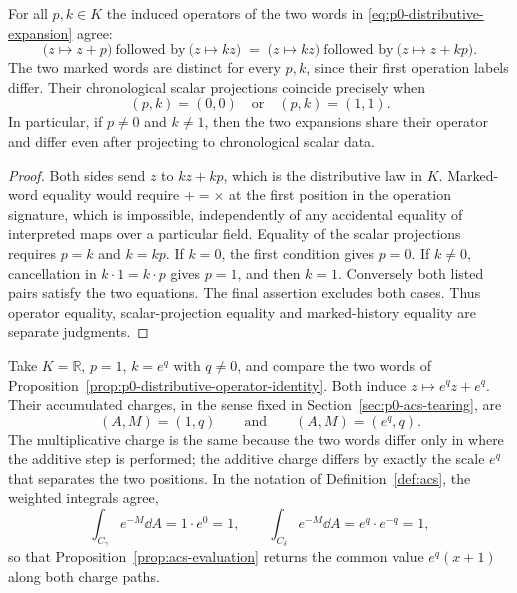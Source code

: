 \begin{proposition}
\label{prop:p0-distributive-operator-identity}
For all $p,k\in K$ the induced operators of the two words in
\eqref{eq:p0-distributive-expansion} agree:
\begin{equation}\label{eq:p0-distributive-identity}
  \bigl(z\mapsto z+p\bigr)\ \text{followed by}\ \bigl(z\mapsto kz\bigr)
  \;=\;
  \bigl(z\mapsto kz\bigr)\ \text{followed by}\ \bigl(z\mapsto z+kp\bigr).
\end{equation}
The two marked words are distinct for every $p,k$, since their first
operation labels differ.  Their chronological scalar projections coincide
precisely when
\[
  (p,k)=(0,0)\quad\text{or}\quad(p,k)=(1,1).
\]
In particular, if $p\ne0$ and $k\ne1$, then the two expansions share their
operator and differ even after projecting to chronological scalar data.
\end{proposition}

\begin{proof}
Both sides send $z$ to $kz+kp$, which is the distributive law in $K$.
Marked-word equality would require $+=\times$ at the first position in the
operation signature, which is impossible, independently of any accidental
equality of interpreted maps over a particular field.  Equality of the
scalar projections requires $p=k$ and $k=kp$.  If $k=0$, the first condition
gives $p=0$.  If $k\ne0$, cancellation in $k\cdot1=k\cdot p$ gives
$p=1$, and then $k=1$.  Conversely both listed pairs satisfy the two
equations.  The final assertion excludes both cases.  Thus operator
equality, scalar-projection equality and marked-history equality are
separate judgments.
\end{proof}

\begin{example}
\label{ex:p0-distributive-charge-transport}
Take $K=\mathbb R$, $p=1$, $k=e^{q}$ with $q\ne0$, and compare the two words
of Proposition~\ref{prop:p0-distributive-operator-identity}.  Both induce
$z\mapsto e^{q}z+e^{q}$.  Their accumulated charges, in the sense fixed in
Section~\ref{sec:p0-acs-tearing}, are
\[
  (A,M)=(1,q)
  \qquad\text{and}\qquad
  (A,M)=(e^{q},q).
\]
The multiplicative charge is the same because the two words differ only in
where the additive step is performed; the additive charge differs by exactly
the scale $e^{q}$ that separates the two positions.  In the notation of
Definition~\ref{def:acs}, the weighted integrals agree,
\[
  \int_{C_{\gamma}}e^{-M}\dd A
  =1\cdot e^{0}=1,
  \qquad
  \int_{C_{\delta}}e^{-M}\dd A
  =e^{q}\cdot e^{-q}=1,
\]
so that Proposition~\ref{prop:acs-evaluation} returns the common value
$e^{q}(x+1)$ along both charge paths.
\end{example}

